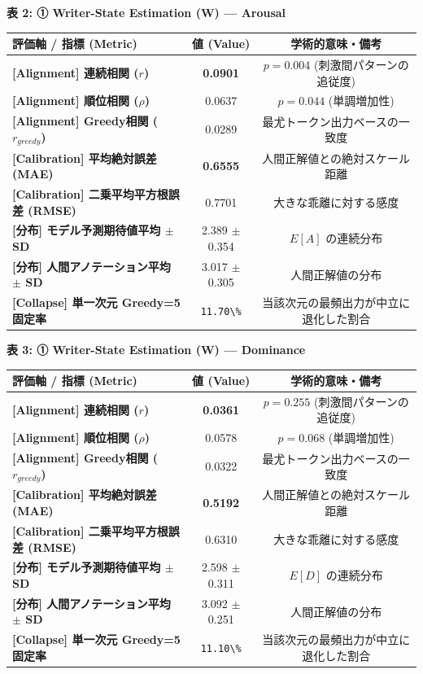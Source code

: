 \textbf{表 2: ① Writer-State Estimation (W) — Arousal}
\begin{center}
\small
\begin{tabular}{lcc}
\toprule
\textbf{評価軸 / 指標 (Metric)} & \textbf{値 (Value)} & \textbf{学術的意味・備考} \\
\midrule
\textbf{[Alignment] 連続相関 ($r$)} & \textbf{0.0901} & $p = 0.004 $ (刺激間パターンの追従度) \\
\textbf{[Alignment] 順位相関 ($\rho$)} & 0.0637 & $p = 0.044 $ (単調増加性) \\
\textbf{[Alignment] Greedy相関 ($r_{greedy}$)} & 0.0289 & 最尤トークン出力ベースの一致度 \\
\textbf{[Calibration] 平均絶対誤差 (MAE)} & \textbf{0.6555} & 人間正解値との絶対スケール距離 \\
\textbf{[Calibration] 二乗平均平方根誤差 (RMSE)} & 0.7701 & 大きな乖離に対する感度 \\
\textbf{[分布] モデル予測期待値平均 $\pm$ SD} & 2.389 $\pm$ 0.354 & $E[A]$ の連続分布 \\
\textbf{[分布] 人間アノテーション平均 $\pm$ SD} & 3.017 $\pm$ 0.305 & 人間正解値の分布 \\
\textbf{[Collapse] 単一次元 Greedy=5 固定率} & \texttt{11.70\textbackslash{}\%} & 当該次元の最頻出力が中立に退化した割合 \\
\bottomrule
\end{tabular}
\end{center}


\textbf{表 3: ① Writer-State Estimation (W) — Dominance}
\begin{center}
\small
\begin{tabular}{lcc}
\toprule
\textbf{評価軸 / 指標 (Metric)} & \textbf{値 (Value)} & \textbf{学術的意味・備考} \\
\midrule
\textbf{[Alignment] 連続相関 ($r$)} & \textbf{0.0361} & $p = 0.255 $ (刺激間パターンの追従度) \\
\textbf{[Alignment] 順位相関 ($\rho$)} & 0.0578 & $p = 0.068 $ (単調増加性) \\
\textbf{[Alignment] Greedy相関 ($r_{greedy}$)} & 0.0322 & 最尤トークン出力ベースの一致度 \\
\textbf{[Calibration] 平均絶対誤差 (MAE)} & \textbf{0.5192} & 人間正解値との絶対スケール距離 \\
\textbf{[Calibration] 二乗平均平方根誤差 (RMSE)} & 0.6310 & 大きな乖離に対する感度 \\
\textbf{[分布] モデル予測期待値平均 $\pm$ SD} & 2.598 $\pm$ 0.311 & $E[D]$ の連続分布 \\
\textbf{[分布] 人間アノテーション平均 $\pm$ SD} & 3.092 $\pm$ 0.251 & 人間正解値の分布 \\
\textbf{[Collapse] 単一次元 Greedy=5 固定率} & \texttt{11.10\textbackslash{}\%} & 当該次元の最頻出力が中立に退化した割合 \\
\bottomrule
\end{tabular}
\end{center}


